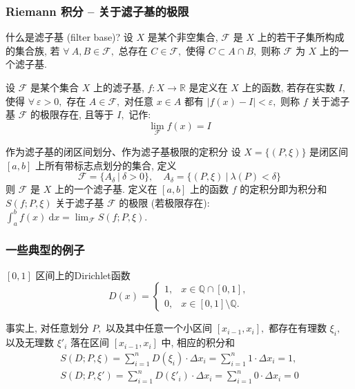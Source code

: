 
\begin{frame}
\frametitle{Riemann 积分 -- 关于滤子基的极限}

\begin{block}{什么是滤子基 (filter base)?}
设 $X$ 是某个非空集合, $\mathcal{F}$ 是 $X$ 上的若干子集所构成的集合族, 若 $\forall~A, B \in \mathcal{F},$ 总存在 $C \in \mathcal{F},$ 使得 $C \subset A \cap B,$ 则称 $\mathcal{F}$ 为 $X$ 上的一个\alert{滤子基}.
\end{block}

\pause

\begin{Def}[关于滤子基的极限]
设 $\mathcal{F}$ 是某个集合 $X$ 上的滤子基, $f: X \to \mathbb{R}$ 是定义在 $X$ 上的函数, 若存在实数 $I,$ 使得 $\forall~\varepsilon > 0,$ 存在 $A \in \mathcal{F},$ 对任意 $x \in A$ 都有 $|f(x) - I| < \varepsilon,$ 则称 $f$ 关于滤子基 $\mathcal{F}$ 的极限存在, 且等于 $I,$ 记作:
\[\lim_{\mathcal{F}} f(x) = I\]
\end{Def}

\pause

\begin{block}{作为滤子基的闭区间划分、作为滤子基极限的定积分}
设 $X = \{(P,\xi)\}$ 是闭区间 $[a,b]$ 上所有带标志点划分的集合, 定义
\[\mathcal{F} = \{A_\delta ~|~ \delta > 0\}, \quad A_\delta = \{(P,\xi) ~|~ \lambda(P) < \delta\}\]
则 $\mathcal{F}$ 是 $X$ 上的一个滤子基. 定义在 $[a,b]$ 上的函数 $f$ 的定积分即为积分和 $S(f; P,\xi)$ 关于滤子基 $\mathcal{F}$ 的极限 (若极限存在): $\int_a^b f(x) ~ \mathrm{d}x = \lim_{\mathcal{F}} S(f; P,\xi).$
\end{block}

\end{frame}


\begin{frame}
\frametitle{一些典型的例子}

\begin{eg}
$[0, 1]$ 区间上的Dirichlet函数
\[
D(x) = \begin{cases}
1, & x \in \mathbb{Q} \cap [0, 1],\\
0, & x \in [0, 1] \setminus \mathbb{Q}.
\end{cases}
\]
\end{eg}

\pause
\vspace{1em}

事实上, 对任意划分 $P,$ 以及其中任意一个小区间 $[x_{i-1}, x_i],$ 都存在有理数 $\xi_i,$ 以及无理数 $\xi'_i$ 落在区间 $[x_{i-1}, x_i]$ 中, 相应的积分和
\begin{gather*}
S(D; P, \xi) = \sum_{i=1}^n D(\xi_i) \cdot \Delta x_i = \sum_{i=1}^n 1 \cdot \Delta x_i = 1, \\
S(D; P, \xi') = \sum_{i=1}^n D(\xi'_i) \cdot \Delta x_i = \sum_{i=1}^n 0 \cdot \Delta x_i = 0
\end{gather*}

\end{frame}

